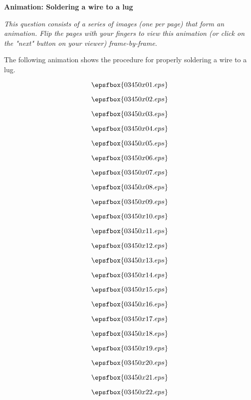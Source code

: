

\centerline{\bf Animation: Soldering a wire to a lug}

\vskip 10pt

{\it This question consists of a series of images (one per page) that form an animation.  Flip the pages with your fingers to view this animation (or click on the "next" button on your viewer) frame-by-frame.}

\vskip 10pt

The following animation shows the procedure for properly soldering a wire to a lug.

\vfil \eject
$$\epsfbox{03450x01.eps}$$

\vfil \eject
$$\epsfbox{03450x02.eps}$$

\vfil \eject
$$\epsfbox{03450x03.eps}$$

\vfil \eject
$$\epsfbox{03450x04.eps}$$

\vfil \eject
$$\epsfbox{03450x05.eps}$$

\vfil \eject
$$\epsfbox{03450x06.eps}$$

\vfil \eject
$$\epsfbox{03450x07.eps}$$

\vfil \eject
$$\epsfbox{03450x08.eps}$$

\vfil \eject
$$\epsfbox{03450x09.eps}$$

\vfil \eject
$$\epsfbox{03450x10.eps}$$

\vfil \eject
$$\epsfbox{03450x11.eps}$$

\vfil \eject
$$\epsfbox{03450x12.eps}$$

\vfil \eject
$$\epsfbox{03450x13.eps}$$

\vfil \eject
$$\epsfbox{03450x14.eps}$$

\vfil \eject
$$\epsfbox{03450x15.eps}$$

\vfil \eject
$$\epsfbox{03450x16.eps}$$

\vfil \eject
$$\epsfbox{03450x17.eps}$$

\vfil \eject
$$\epsfbox{03450x18.eps}$$

\vfil \eject
$$\epsfbox{03450x19.eps}$$

\vfil \eject
$$\epsfbox{03450x20.eps}$$

\vfil \eject
$$\epsfbox{03450x21.eps}$$

\vfil \eject
$$\epsfbox{03450x22.eps}$$

